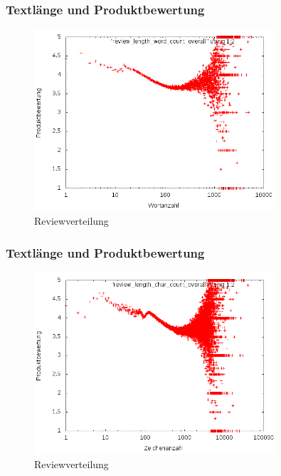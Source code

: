 \documentclass{beamer}
\begin{document}
	\begin{frame}
	\frametitle{Textlänge und Produktbewertung}
	\begin{figure}[H]
    \includegraphics[width=0.8\textwidth]{_results/word_rating.png}
    \caption{Reviewverteilung}
	\end{figure}
	\end{frame}
	
	\begin{frame}
	\frametitle{Textlänge und Produktbewertung}
	\begin{figure}[H]
    \includegraphics[width=0.8\textwidth]{_results/char_rating.png}
    \caption{Reviewverteilung}
	\end{figure}
	\end{frame}
	
\end{document}

